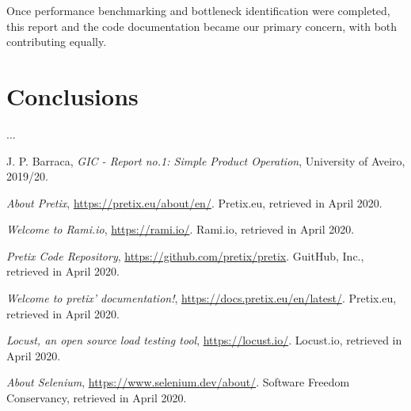 \documentclass[12pt]{article}
\begin{document}
Once performance benchmarking and bottleneck identification were completed, this report and the code documentation became our primary concern, with both 
contributing equally.

\newpage
\section*{Conclusions} \label{conclusions} %

...

\begin{thebibliography}{9} %
  

    J. P. Barraca,
    \textit{GIC - Report no.1: Simple Product Operation},
    University of Aveiro,
    2019/20.

    \textit{About Pretix},
    \url{https://pretix.eu/about/en/}.
    Pretix.eu,
    retrieved in April 2020.

    \textit{Welcome to Rami.io},
    \url{https://rami.io/}.
    Rami.io,
    retrieved in April 2020.

    \textit{Pretix Code Repository},
    \url{https://github.com/pretix/pretix}.
    GuitHub, Inc.,
    retrieved in April 2020.

    \textit{Welcome to pretix' documentation!},
    \url{https://docs.pretix.eu/en/latest/}.
    Pretix.eu,
    retrieved in April 2020.



    \textit{Locust, an open source load testing tool},
    \url{https://locust.io/}.
    Locust.io,
    retrieved in April 2020.

    \textit{About Selenium},
    \url{https://www.selenium.dev/about/}.
    Software Freedom Conservancy,
    retrieved in April 2020.

\end{thebibliography}

\clearpage
\end{document}
